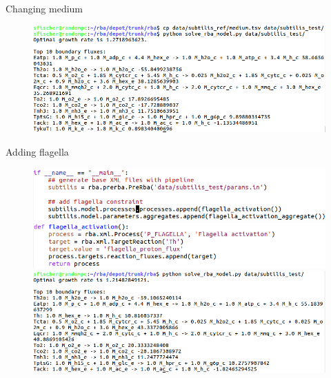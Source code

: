 \documentclass{beamer}
\begin{document}
\begin{frame}{Changing medium}
  \begin{figure}
    \centering
    \includegraphics[width=\linewidth]{added_medium}
  \end{figure}
\end{frame}

\begin{frame}{Adding flagella}
  \begin{figure}
    \centering
    \includegraphics[width=\linewidth]{added_flagella_code_1} \\
    \includegraphics[width=\linewidth]{added_flagella_code_2} \\
    \includegraphics[width=\linewidth]{added_flagella_solver}
  \end{figure}
\end{frame}
\end{document}
